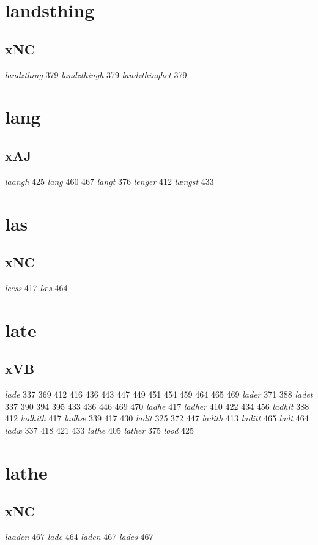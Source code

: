\documentclass[a4paper,twocolumn]{article}
\begin{document}
\section{landsthing}
\label{sec:org350b2fe}
\subsection{xNC}
\label{sec:org2b9e92d}
\emph{landzthing} 379 \emph{landzthingh} 379 \emph{landzthinghet} 379 
\section{lang}
\label{sec:org5d5bc2f}
\subsection{xAJ}
\label{sec:org404dc5a}
\emph{laangh} 425 \emph{lang} 460 467 \emph{langt} 376 \emph{lenger} 412 \emph{længst} 433 
\section{las}
\label{sec:org950341b}
\subsection{xNC}
\label{sec:orgcd135ff}
\emph{leess} 417 \emph{læs} 464 
\section{late}
\label{sec:org6f0008e}
\subsection{xVB}
\label{sec:orgf931942}
\emph{lade} 337 369 412 416 436 443 447 449 451 454 459 464 465 469 \emph{lader} 371 388 \emph{ladet} 337 390 394 395 433 436 446 469 470 \emph{ladhe} 417 \emph{ladher} 410 422 434 456 \emph{ladhit} 388 412 \emph{ladhith} 417 \emph{ladhæ} 339 417 430 \emph{ladit} 325 372 447 \emph{ladith} 413 \emph{laditt} 465 \emph{ladt} 464 \emph{ladæ} 337 418 421 433 \emph{lathe} 405 \emph{lather} 375 \emph{lood} 425 
\section{lathe}
\label{sec:org31943d3}
\subsection{xNC}
\label{sec:org4273c32}
\emph{laaden} 467 \emph{lade} 464 \emph{laden} 467 \emph{lades} 467 
\end{document}
